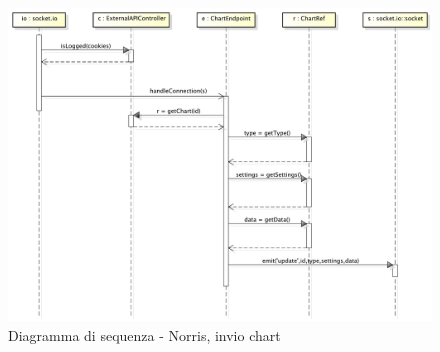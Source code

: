             
            \begin{figure}[H]
                \centering
                \includegraphics[scale=0.3]{DefinizioneDiProdotto/Pics/NorrisInvioChart}
                \caption{Diagramma di sequenza - Norris, invio chart}
            \end{figure}